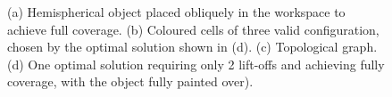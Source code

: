 \documentclass[journal]{IEEEtran}
\begin{document}
\begin{figure}[t]
\centering
{}
\caption{(a) Hemispherical object placed obliquely in the workspace to achieve full coverage. 
(b) Coloured cells of three valid configuration, chosen by the optimal solution shown in (d). (c) Topological graph. (d) One optimal solution requiring only 2 lift-offs and achieving fully coverage, with the object fully painted over). 
}\label{figsloped}
\end{figure}
\end{document}
